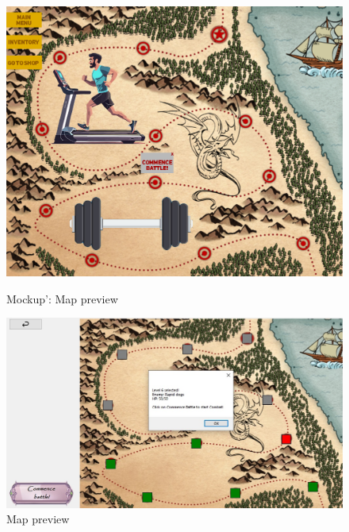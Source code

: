 \begin{figure}[h]
    \centering
    \begin{minipage}[b]{0.45\textwidth}
        \centering
    \includegraphics[width=\textwidth]{omockup2.jpg}
    \caption{Mockup': Map preview}
    \end{minipage}
    \hfill
    \begin{minipage}[b]{0.45\textwidth}
        \centering
    \includegraphics[width=\textwidth]{mockup2.jpg}
    \caption{Map preview}
    \end{minipage}
\end{figure}


